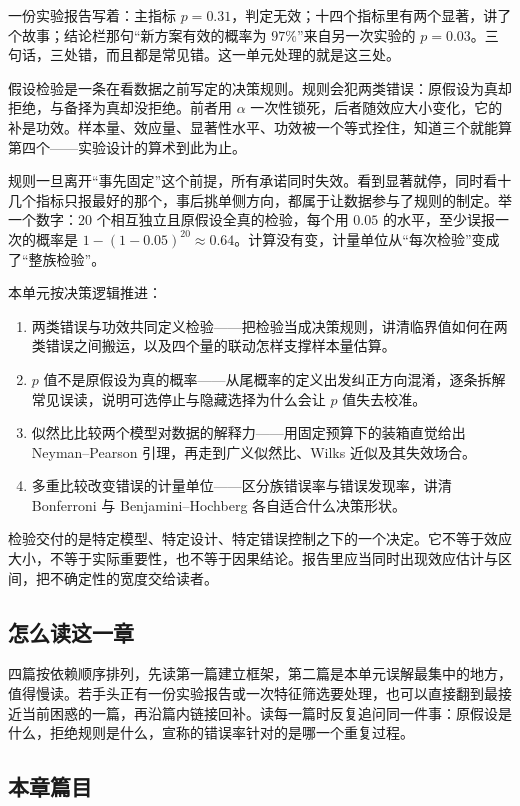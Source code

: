 一份实验报告写着：主指标 \(p=0.31\)，判定无效；十四个指标里有两个显著，讲了个故事；结论栏那句``新方案有效的概率为 \(97\%\)''来自另一次实验的 \(p=0.03\)。三句话，三处错，而且都是常见错。这一单元处理的就是这三处。

假设检验是一条在看数据之前写定的决策规则。规则会犯两类错误：原假设为真却拒绝，与备择为真却没拒绝。前者用 \(\alpha\) 一次性锁死，后者随效应大小变化，它的补是功效。样本量、效应量、显著性水平、功效被一个等式拴住，知道三个就能算第四个——实验设计的算术到此为止。

规则一旦离开``事先固定''这个前提，所有承诺同时失效。看到显著就停，同时看十几个指标只报最好的那个，事后挑单侧方向，都属于让数据参与了规则的制定。举一个数字：\(20\) 个相互独立且原假设全真的检验，每个用 \(0.05\) 的水平，至少误报一次的概率是 \(1-(1-0.05)^{20}\approx 0.64\)。计算没有变，计量单位从``每次检验''变成了``整族检验''。

本单元按决策逻辑推进：

\begin{enumerate}
\tightlist
\item
  两类错误与功效共同定义检验——把检验当成决策规则，讲清临界值如何在两类错误之间搬运，以及四个量的联动怎样支撑样本量估算。
\item
  \(p\) 值不是原假设为真的概率——从尾概率的定义出发纠正方向混淆，逐条拆解常见误读，说明可选停止与隐藏选择为什么会让 \(p\) 值失去校准。
\item
  似然比比较两个模型对数据的解释力——用固定预算下的装箱直觉给出 Neyman--Pearson 引理，再走到广义似然比、Wilks 近似及其失效场合。
\item
  多重比较改变错误的计量单位——区分族错误率与错误发现率，讲清 Bonferroni 与 Benjamini--Hochberg 各自适合什么决策形状。
\end{enumerate}

检验交付的是特定模型、特定设计、特定错误控制之下的一个决定。它不等于效应大小，不等于实际重要性，也不等于因果结论。报告里应当同时出现效应估计与区间，把不确定性的宽度交给读者。

\subsection{怎么读这一章}

四篇按依赖顺序排列，先读第一篇建立框架，第二篇是本单元误解最集中的地方，值得慢读。若手头正有一份实验报告或一次特征筛选要处理，也可以直接翻到最接近当前困惑的一篇，再沿篇内链接回补。读每一篇时反复追问同一件事：原假设是什么，拒绝规则是什么，宣称的错误率针对的是哪一个重复过程。

\subsection{本章篇目}

